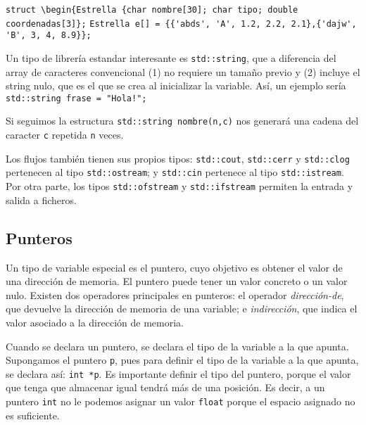 \documentclass[a4paper]{article}
\begin{document}
	\verb|struct \begin{Estrella {char nombre[30]; char tipo; double coordenadas[3]};|\linebreak
	\verb|Estrella e[] = {{'abds', 'A', 1.2, 2.2, 2.1},{'dajw', 'B', 3, 4, 8.9}};|
	
	Un tipo de librería estandar interesante es \verb|std::string|, que a diferencia del array de caracteres convencional (1) no requiere un tamaño previo y (2) incluye el string nulo, que es el que se crea al inicializar la variable. Así, un ejemplo sería \verb|std::string frase = "Hola!";|
	
	Si seguimos la estructura \verb|std::string nombre(n,c)| nos generará una cadena del caracter \verb|c| repetida \verb|n| veces.
	
	Los flujos también tienen sus propios tipos: \verb|std::cout|, \verb|std::cerr| y \verb|std::clog| pertenecen al tipo \verb|std::ostream|; y \verb|std::cin| pertenece al tipo \verb|std::istream|. Por otra parte, los tipos \verb|std::ofstream| y \verb|std::ifstream| permiten la entrada y salida a ficheros.
	
	\subsection{Punteros}
	Un tipo de variable especial es el puntero, cuyo objetivo es obtener el valor de una dirección de memoria. El puntero puede tener un valor concreto o un valor nulo. Existen dos operadores principales en punteros: el operador \textit{dirección-de}, que devuelve la dirección de memoria de una variable; e \textit{indirección}, que indica el valor asociado a la dirección de memoria.
	
	Cuando se declara un puntero, se declara el tipo de la variable a la que apunta. Supongamos el puntero \verb|p|, pues para definir el tipo de la variable a la que apunta, se declara así: \verb|int *p|. Es importante definir el tipo del puntero, porque el valor que tenga que almacenar igual tendrá más de una posición. Es decir, a un puntero \verb|int| no le podemos asignar un valor \verb|float| porque el espacio asignado no es suficiente.
	
\end{document}
